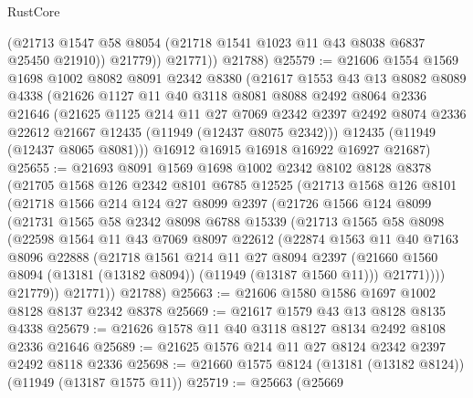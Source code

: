 \begin{lexlean}{RustCore}
\begin{coremodule}
              (@21713 @1547 @58 @8054 (@21718 @1541 @1023 @11 @43 @8038 @6837 @25450 @21910))
              @21779))
          @21771))
      @21788)
@25579 := @21606
    @1554
    @1569
    @1698
    @1002
    @8082
    @8091
    @2342
    @8380
    (@21617
      @1553
      @43
      @13
      @8082
      @8089
      @4338
      (@21626
        @1127
        @11
        @40
        @3118
        @8081
        @8088
        @2492
        @8064
        @2336
        @21646
        (@21625
          @1125
          @214
          @11
          @27
          @7069
          @2342
          @2397
          @2492
          @8074
          @2336
          @22612
          @21667
          @12435
          (@11949 (@12437 @8075 @2342)))
        @12435
        (@11949 (@12437 @8065 @8081)))
      @16912
      @16915
      @16918
      @16922
      @16927
      @21687)
@25655 := @21693
    @8091
    @1569
    @1698
    @1002
    @2342
    @8102
    @8128
    @8378
    (@21705
      @1568
      @126
      @2342
      @8101
      @6785
      @12525
      (@21713
        @1568
        @126
        @8101
        (@21718
          @1566
          @214
          @124
          @27
          @8099
          @2397
          (@21726
            @1566
            @124
            @8099
            (@21731
              @1565
              @58
              @2342
              @8098
              @6788
              @15339
              (@21713
                @1565
                @58
                @8098
                (@22598
                  @1564
                  @11
                  @43
                  @7069
                  @8097
                  @22612
                  (@22874
                    @1563
                    @11
                    @40
                    @7163
                    @8096
                    @22888
                    (@21718
                      @1561
                      @214
                      @11
                      @27
                      @8094
                      @2397
                      (@21660 @1560 @8094 (@13181 (@13182 @8094)) (@11949 (@13187 @1560 @11)))
                      @21771))))
              @21779))
          @21771))
      @21788)
@25663 := @21606 @1580 @1586 @1697 @1002 @8128 @8137 @2342 @8378
@25669 := @21617 @1579 @43 @13 @8128 @8135 @4338
@25679 := @21626 @1578 @11 @40 @3118 @8127 @8134 @2492 @8108 @2336 @21646
@25689 := @21625 @1576 @214 @11 @27 @8124 @2342 @2397 @2492 @8118 @2336
@25698 := @21660 @1575 @8124 (@13181 (@13182 @8124)) (@11949 (@13187 @1575 @11))
@25719 := @25663
    (@25669

\end{coremodule}
\end{lexlean}
